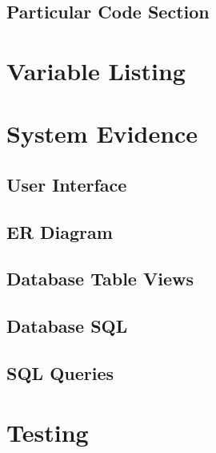 \subsection{Particular Code Section}


\begin{comment}
\begin{figure}[H]
    \pythonfile[firstline=5,lastline=10]{./tex/function_programs/print_function.py}
    \caption{The print() function} \label{fig:print_function}
\end{figure}
\end{comment}

\section{Variable Listing}

\section{System Evidence}

\subsection{User Interface}

\subsection{ER Diagram}

\subsection{Database Table Views}

\subsection{Database SQL}

\subsection{SQL Queries}

\section{Testing}

